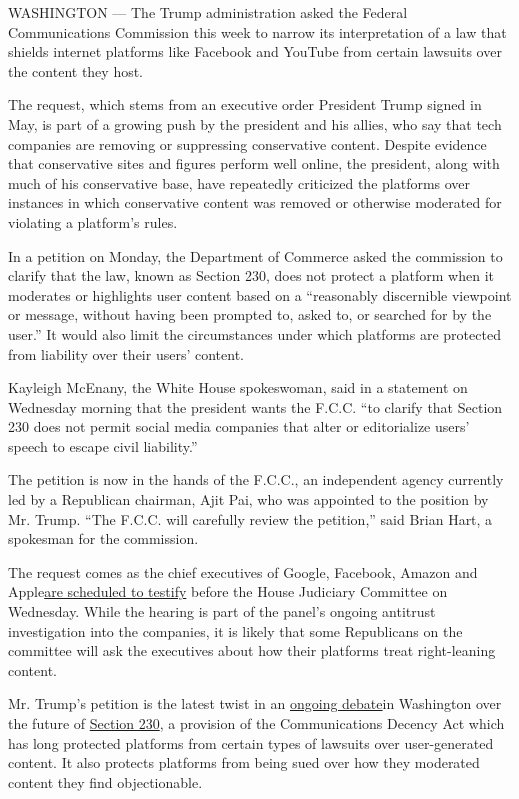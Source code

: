 WASHINGTON --- The Trump administration asked the Federal Communications
Commission this week to narrow its interpretation of a law that shields
internet platforms like Facebook and YouTube from certain lawsuits over
the content they host.

The request, which stems from an executive order President Trump signed
in May, is part of a growing push by the president and his allies, who
say that tech companies are removing or suppressing conservative
content. Despite evidence that conservative sites and figures perform
well online, the president, along with much of his conservative base,
have repeatedly criticized the platforms over instances in which
conservative content was removed or otherwise moderated for violating a
platform's rules.

In a petition on Monday, the Department of Commerce asked the commission
to clarify that the law, known as Section 230, does not protect a
platform when it moderates or highlights user content based on a
``reasonably discernible viewpoint or message, without having been
prompted to, asked to, or searched for by the user.'' It would also
limit the circumstances under which platforms are protected from
liability over their users' content.

Kayleigh McEnany, the White House spokeswoman, said in a statement on
Wednesday morning that the president wants the F.C.C. ``to clarify that
Section 230 does not permit social media companies that alter or
editorialize users' speech to escape civil liability.''

The petition is now in the hands of the F.C.C., an independent agency
currently led by a Republican chairman, Ajit Pai, who was appointed to
the position by Mr. Trump. ``The F.C.C. will carefully review the
petition,'' said Brian Hart, a spokesman for the commission.

The request comes as the chief executives of Google, Facebook, Amazon
and
Apple\href{https://www.nytimes.com/2020/07/28/technology/amazon-apple-facebook-google-antitrust-hearing.html}{are
scheduled to testify} before the House Judiciary Committee on Wednesday.
While the hearing is part of the panel's ongoing antitrust investigation
into the companies, it is likely that some Republicans on the committee
will ask the executives about how their platforms treat right-leaning
content.

Mr. Trump's petition is the latest twist in an
\href{https://www.nytimes.com/2020/06/17/technology/justice-dept-urges-rolling-back-legal-shield-for-tech-companies.html}{ongoing
debate}in Washington over the future of
\href{https://www.nytimes.com/2020/05/28/business/section-230-internet-speech.html}{Section
230}, a provision of the Communications Decency Act which has long
protected platforms from certain types of lawsuits over user-generated
content. It also protects platforms from being sued over how they
moderated content they find objectionable.

